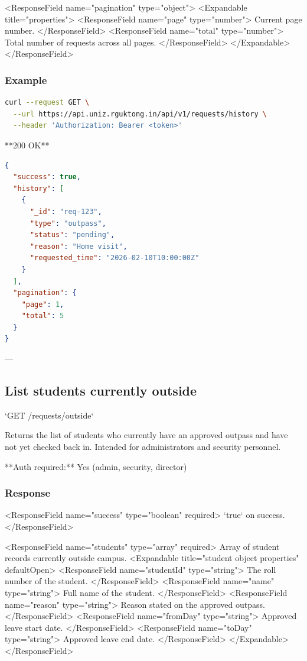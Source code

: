 <ResponseField name="pagination" type="object">
  <Expandable title="properties">
    <ResponseField name="page" type="number">
      Current page number.
    </ResponseField>
    <ResponseField name="total" type="number">
      Total number of requests across all pages.
    </ResponseField>
  </Expandable>
</ResponseField>

\subsubsection{Example}

\begin{lstlisting}[language=bash]
curl --request GET \
  --url https://api.uniz.rguktong.in/api/v1/requests/history \
  --header 'Authorization: Bearer <token>'

\end{lstlisting}

**200 OK**

\begin{lstlisting}[language=json]
{
  "success": true,
  "history": [
    {
      "_id": "req-123",
      "type": "outpass",
      "status": "pending",
      "reason": "Home visit",
      "requested_time": "2026-02-10T10:00:00Z"
    }
  ],
  "pagination": {
    "page": 1,
    "total": 5
  }
}

\end{lstlisting}

---

\subsection{List students currently outside}

`GET /requests/outside`

Returns the list of students who currently have an approved outpass and have not yet checked back in. Intended for administrators and security personnel.

**Auth required:** Yes (admin, security, director)

\subsubsection{Response}

<ResponseField name="success" type="boolean" required>
  `true` on success.
</ResponseField>

<ResponseField name="students" type="array" required>
  Array of student records currently outside campus.
  <Expandable title="student object properties" defaultOpen>
    <ResponseField name="studentId" type="string">
      The roll number of the student.
    </ResponseField>
    <ResponseField name="name" type="string">
      Full name of the student.
    </ResponseField>
    <ResponseField name="reason" type="string">
      Reason stated on the approved outpass.
    </ResponseField>
    <ResponseField name="fromDay" type="string">
      Approved leave start date.
    </ResponseField>
    <ResponseField name="toDay" type="string">
      Approved leave end date.
    </ResponseField>
  </Expandable>
</ResponseField>

